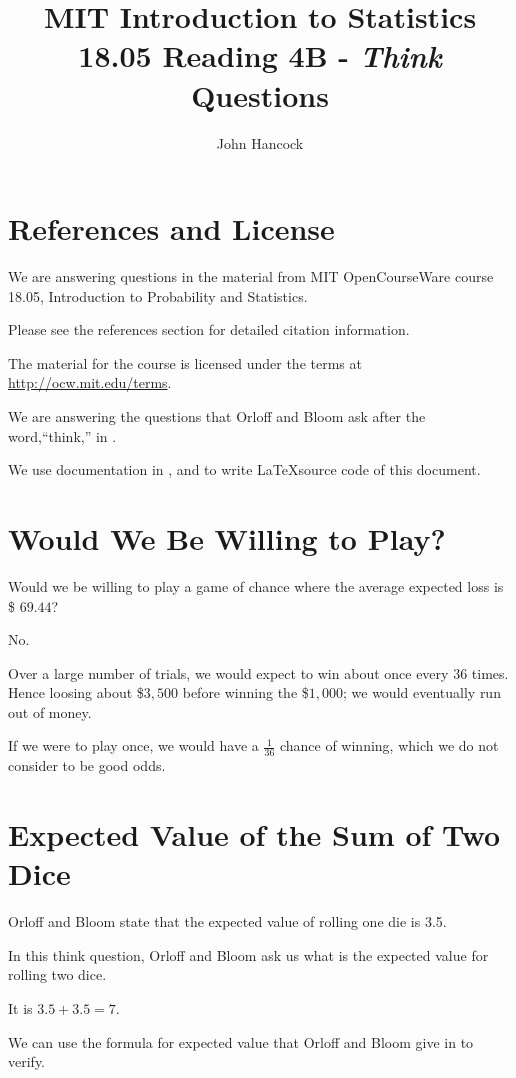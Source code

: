 \documentclass[a4paper,11pt]{article}
\author{John Hancock}
\title{MIT Introduction to Statistics 18.05 Reading 4B - \textit{Think}
  Questions }
\begin{document}
\maketitle
\tableofcontents
\section{References and License}
We are answering questions in the material from MIT OpenCourseWare
course 18.05, Introduction to Probability and Statistics.

Please see the references section for detailed citation information.

The material for the course is licensed under the terms at 
\url{http://ocw.mit.edu/terms}.

We are answering the questions that Orloff and Bloom ask after
the word,``think,'' in \cite{reading4b}.

We use documentation in \cite{texDoubleQuotes}, and \cite{texDollarSign}
to write \LaTeX source code of this document.
 
\label{prob1}
\section{Would We Be Willing to Play?}

Would we be willing to play a game of chance where the average expected
loss is \$ $69.44$?

No.

Over a large number of trials, we would expect to win about once
every $36$ times.  Hence loosing about \$$3,500$ before winning the
\$$1,000$; we would eventually run out of money.

If we were to play once, we would have a $\frac{1}{36}$ chance of 
winning, which we do not consider to be good odds.

\section{Expected Value of the Sum of Two Dice} \label{sumTwoDiceSect}

Orloff and Bloom state that the expected  value of rolling one die
is 3.5.

In this think question, Orloff and Bloom ask us what is the expected
value for rolling two dice.

It is $3.5 + 3.5 = 7$.

We can use the formula for expected value that Orloff and Bloom give in
\cite{reading4b} to verify.
\end{document}

